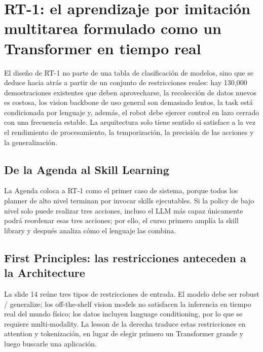 \section{RT-1: el aprendizaje por imitación multitarea formulado como un Transformer en tiempo real}

El diseño de RT-1 no parte de una tabla de clasificación de modelos, sino que se deduce hacia atrás a partir de un conjunto de restricciones reales: hay 130,000 demostraciones existentes que deben aprovecharse, la recolección de datos nuevos es costosa, los vision backbone de uso general son demasiado lentos, la task está condicionada por lenguaje y, además, el robot debe ejercer control en lazo cerrado con una frecuencia estable. La arquitectura solo tiene sentido si satisface a la vez el rendimiento de procesamiento, la temporización, la precisión de las acciones y la generalización.

\subsection{De la Agenda al Skill Learning}

La Agenda coloca a RT-1 como el primer caso de sistema, porque todos los planner de alto nivel terminan por invocar skills ejecutables. Si la policy de bajo nivel solo puede realizar tres acciones, incluso el LLM más capaz únicamente podrá reordenar esas tres acciones; por ello, el curso primero amplía la skill library y después analiza cómo el lenguaje las combina.


\subsection{First Principles: las restricciones anteceden a la Architecture}

La slide 14 reúne tres tipos de restricciones de entrada. El modelo debe ser robust / generalize; los off-the-shelf vision models no satisfacen la inferencia en tiempo real del mundo físico; los datos incluyen language conditioning, por lo que se requiere multi-modality. La lesson de la derecha traduce estas restricciones en attention y tokenización, en lugar de elegir primero un Transformer grande y luego buscarle una aplicación.


